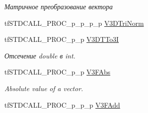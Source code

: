 \begin{DoxyCompactItemize}
\begin{DoxyCompactList}\small\item\em Матричное преобразование вектора \end{DoxyCompactList}\item 
tf\-S\-T\-D\-C\-A\-L\-L\-\_\-\-P\-R\-O\-C\-\_\-p\-\_\-p\-\_\-p\-\_\-p \hyperlink{structs_functions_vector_c_p_u_a45440abed647b0c995e7390ccc9385a6}{V3\-D\-Tri\-Norm}
\item 
\hypertarget{structs_functions_vector_c_p_u_af476bc2dba3f531ff0ed587b602c2528}{tf\-S\-T\-D\-C\-A\-L\-L\-\_\-\-P\-R\-O\-C\-\_\-p\-\_\-p \hyperlink{structs_functions_vector_c_p_u_af476bc2dba3f531ff0ed587b602c2528}{V3\-D\-T\-To3\-I}}\label{structs_functions_vector_c_p_u_af476bc2dba3f531ff0ed587b602c2528}

\begin{DoxyCompactList}\small\item\em Отсечение double в int. \end{DoxyCompactList}\item 
\hypertarget{structs_functions_vector_c_p_u_a3517991a0d4e518bd5ee54d57f07dbec}{tf\-S\-T\-D\-C\-A\-L\-L\-\_\-\-P\-R\-O\-C\-\_\-p\-\_\-p \hyperlink{structs_functions_vector_c_p_u_a3517991a0d4e518bd5ee54d57f07dbec}{V3\-F\-Abs}}\label{structs_functions_vector_c_p_u_a3517991a0d4e518bd5ee54d57f07dbec}

\begin{DoxyCompactList}\small\item\em Absolute value of a vector. \end{DoxyCompactList}\item 
\hypertarget{structs_functions_vector_c_p_u_ad7afb1bce23e757fc33a6e3b34997088}{tf\-S\-T\-D\-C\-A\-L\-L\-\_\-\-P\-R\-O\-C\-\_\-p\-\_\-p\-\_\-p \hyperlink{structs_functions_vector_c_p_u_ad7afb1bce23e757fc33a6e3b34997088}{V3\-F\-Add}}\label{structs_functions_vector_c_p_u_ad7afb1bce23e757fc33a6e3b34997088}


\end{DoxyCompactItemize}
